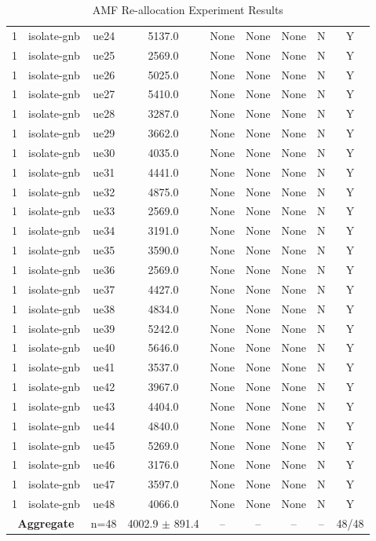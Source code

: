\begin{table}[ht]
\begin{tabular}{|c|c|c|c|c|c|c|c|c|}
1 & isolate-gnb & ue24 & 5137.0 & None & None & None & N & Y \\
1 & isolate-gnb & ue25 & 2569.0 & None & None & None & N & Y \\
1 & isolate-gnb & ue26 & 5025.0 & None & None & None & N & Y \\
1 & isolate-gnb & ue27 & 5410.0 & None & None & None & N & Y \\
1 & isolate-gnb & ue28 & 3287.0 & None & None & None & N & Y \\
1 & isolate-gnb & ue29 & 3662.0 & None & None & None & N & Y \\
1 & isolate-gnb & ue30 & 4035.0 & None & None & None & N & Y \\
1 & isolate-gnb & ue31 & 4441.0 & None & None & None & N & Y \\
1 & isolate-gnb & ue32 & 4875.0 & None & None & None & N & Y \\
1 & isolate-gnb & ue33 & 2569.0 & None & None & None & N & Y \\
1 & isolate-gnb & ue34 & 3191.0 & None & None & None & N & Y \\
1 & isolate-gnb & ue35 & 3590.0 & None & None & None & N & Y \\
1 & isolate-gnb & ue36 & 2569.0 & None & None & None & N & Y \\
1 & isolate-gnb & ue37 & 4427.0 & None & None & None & N & Y \\
1 & isolate-gnb & ue38 & 4834.0 & None & None & None & N & Y \\
1 & isolate-gnb & ue39 & 5242.0 & None & None & None & N & Y \\
1 & isolate-gnb & ue40 & 5646.0 & None & None & None & N & Y \\
1 & isolate-gnb & ue41 & 3537.0 & None & None & None & N & Y \\
1 & isolate-gnb & ue42 & 3967.0 & None & None & None & N & Y \\
1 & isolate-gnb & ue43 & 4404.0 & None & None & None & N & Y \\
1 & isolate-gnb & ue44 & 4840.0 & None & None & None & N & Y \\
1 & isolate-gnb & ue45 & 5269.0 & None & None & None & N & Y \\
1 & isolate-gnb & ue46 & 3176.0 & None & None & None & N & Y \\
1 & isolate-gnb & ue47 & 3597.0 & None & None & None & N & Y \\
1 & isolate-gnb & ue48 & 4066.0 & None & None & None & N & Y \\
\multicolumn{2}{|c|}{\textbf{Aggregate}} & n=48 & 4002.9 $\pm$ 891.4 & -- & -- & -- & -- & 48/48 \\
\hline
\end{tabular}
\caption{AMF Re-allocation Experiment Results}
\label{tab:amf_realloc}
\end{table}
